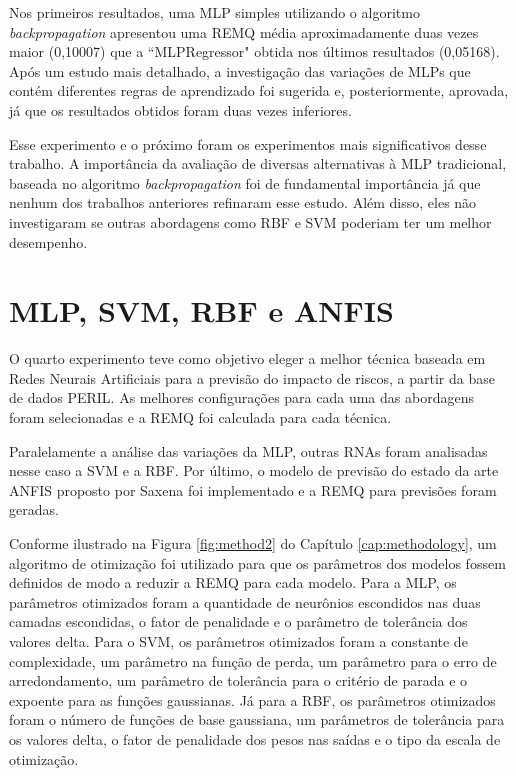 Nos primeiros resultados, uma MLP simples utilizando o algoritmo \textit{backpropagation} apresentou uma REMQ média aproximadamente duas vezes maior (0,10007) que a ``MLPRegressor" obtida nos últimos resultados (0,05168). Após um estudo mais detalhado, a investigação das variações de MLPs que contém diferentes regras de aprendizado foi sugerida e, posteriormente, aprovada, já que os resultados obtidos foram duas vezes inferiores.

Esse experimento e o próximo foram os experimentos mais significativos desse trabalho. A importância da avaliação de diversas alternativas à MLP tradicional, baseada no algoritmo \textit{backpropagation} foi de fundamental importância já que nenhum dos trabalhos anteriores refinaram esse estudo. Além disso, eles não investigaram se outras abordagens como RBF e SVM poderiam ter um melhor desempenho.

\section{MLP, SVM, RBF e ANFIS}

O quarto experimento teve como objetivo eleger a melhor técnica baseada em Redes Neurais Artificiais para a previsão do impacto de riscos, a partir da base de dados PERIL. As melhores configurações para cada uma das abordagens foram selecionadas e a REMQ foi calculada para cada técnica.

Paralelamente a análise das variações da MLP, outras RNAs foram analisadas nesse caso a SVM e a RBF. Por último, o modelo de previsão do estado da arte ANFIS proposto por Saxena \cite{saxena2012software} foi implementado e a REMQ para previsões foram geradas.

Conforme ilustrado na Figura \ref{fig:method2} do Capítulo \ref{cap:methodology}, um algoritmo de otimização foi utilizado para que os parâmetros dos modelos fossem definidos de modo a reduzir a REMQ para cada modelo. Para a MLP, os parâmetros otimizados foram a quantidade de neurônios escondidos nas duas camadas escondidas, o fator de penalidade e o parâmetro de tolerância dos valores delta. Para o SVM, os parâmetros otimizados foram a constante de complexidade, um parâmetro na função de perda, um parâmetro para o erro de arredondamento, um parâmetro de tolerância para o critério de parada e o expoente para as funções gaussianas. Já para a RBF, os parâmetros otimizados foram o número de funções de base gaussiana, um parâmetros de tolerância para os valores delta, o fator de penalidade dos pesos nas saídas e o tipo da escala de otimização.

